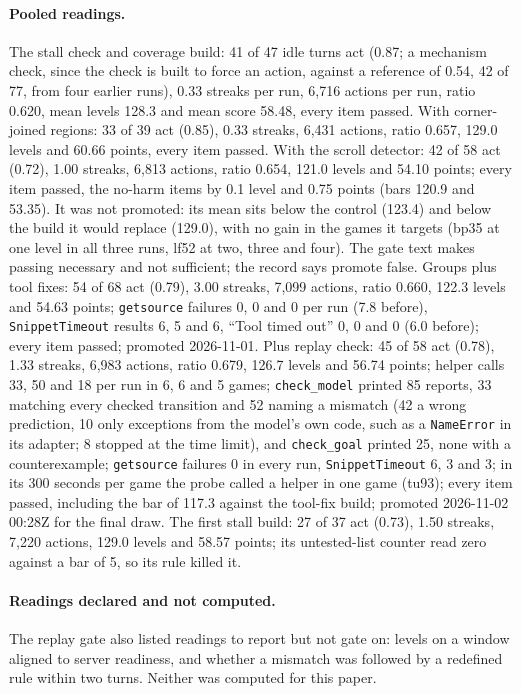 \paragraph{Pooled readings.}
The stall check and coverage build: 41 of 47 idle turns act (0.87; a mechanism check, since the check is built to force an action, against a reference of 0.54, 42 of 77, from four earlier runs), 0.33 streaks per run, 6,716 actions per run, ratio 0.620, mean levels 128.3 and mean score 58.48, every item passed. %
With corner-joined regions: 33 of 39 act (0.85), 0.33 streaks, 6,431 actions, ratio 0.657, 129.0 levels and 60.66 points, every item passed. %
With the scroll detector: 42 of 58 act (0.72), 1.00 streaks, 6,813 actions, ratio 0.654, 121.0 levels and 54.10 points; every item passed, the no-harm items by 0.1 level and 0.75 points (bars 120.9 and 53.35). It was not promoted: its mean sits below the control (123.4) and below the build it would replace (129.0), with no gain in the games it targets (bp35 at one level in all three runs, lf52 at two, three and four). The gate text makes passing necessary and not sufficient; the record says promote false. %
Groups plus tool fixes: 54 of 68 act (0.79), 3.00 streaks, 7,099 actions, ratio 0.660, 122.3 levels and 54.63 points; \texttt{getsource} failures 0, 0 and 0 per run (7.8 before), \texttt{SnippetTimeout} results 6, 5 and 6, ``Tool timed out'' 0, 0 and 0 (6.0 before); every item passed; promoted 2026-11-01. %
Plus replay check: 45 of 58 act (0.78), 1.33 streaks, 6,983 actions, ratio 0.679, 126.7 levels and 56.74 points; helper calls 33, 50 and 18 per run in 6, 6 and 5 games; \texttt{check\_model} printed 85 reports, 33 matching every checked transition and 52 naming a mismatch (42 a wrong prediction, 10 only exceptions from the model's own code, such as a \texttt{NameError} in its adapter; 8 stopped at the time limit), and \texttt{check\_goal} printed 25, none with a counterexample; \texttt{getsource} failures 0 in every run, \texttt{SnippetTimeout} 6, 3 and 3; in its 300 seconds per game the probe called a helper in one game (tu93); every item passed, including the bar of 117.3 against the tool-fix build; promoted 2026-11-02 00:28Z for the final draw. %
The first stall build: 27 of 37 act (0.73), 1.50 streaks, 7,220 actions, 129.0 levels and 58.57 points; its untested-list counter read zero against a bar of 5, so its rule killed it. %

\paragraph{Readings declared and not computed.}
The replay gate also listed readings to report but not gate on: levels on a window aligned to server readiness, and whether a mismatch was followed by a redefined rule within two turns. Neither was computed for this paper. %

